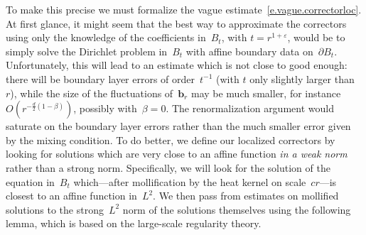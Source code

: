 \documentclass[11pt]{article} %
\numberwithin{equation}{section}
\theoremstyle{definition}
\newcommand{\eps}{\varepsilon}
\renewcommand{\b}{\ensuremath{\mathbf{b}}}
\newcommand{\ep}{\eps}
\begin{document}
\smallskip

To make this precise we must formalize the vague estimate~\eqref{e.vague.correctorloc}.
At first glance, it might seem that the best way to approximate the correctors using only the knowledge of the coefficients in~$B_t$, with $t = r^{1+\ep}$, would be to simply solve the Dirichlet problem in~$B_t$ with affine boundary data on~$\partial B_t$. Unfortunately, this will lead to an estimate which is not close to good enough: there will be boundary layer errors of order~$t^{-1}$ (with $t$ only slightly larger than~$r$), while the size of the fluctuations of~$\b_r$ may be much smaller, for instance~$O(r^{-\frac d2(1-\beta)})$, possibly with~$\beta=0$. The renormalization argument would saturate on the boundary layer errors rather than the much smaller error given by the mixing condition. To do better, we define our localized correctors by looking for solutions which are very close to an affine function \emph{in a weak norm} rather than a strong norm. 
Specifically, we will look for the solution of the equation in~$B_t$ which---after mollification by the heat kernel on scale~$cr$---is closest to an affine function in~$L^2$. We then pass from estimates on mollified solutions to the strong~$L^2$ norm of the solutions themselves using the following lemma, which is based on the large-scale regularity theory. 
\end{document}
